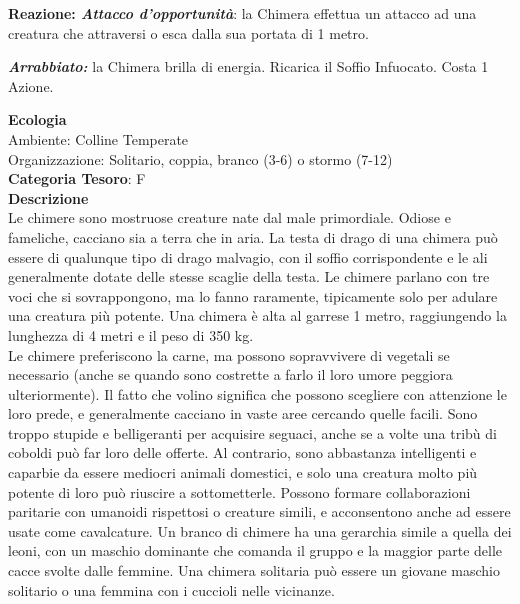 \begin{multicols}{2}
{\textbf{Reazione: \emph{Attacco d'opportunità}}: la Chimera effettua un attacco ad una creatura che attraversi o esca dalla sua portata di 1 metro.

\emph{\textbf{Arrabbiato:}} la Chimera brilla di energia. Ricarica il Soffio Infuocato. Costa 1 Azione.

\textbf{Ecologia}\\
Ambiente: Colline Temperate\\
Organizzazione: Solitario, coppia, branco (3-6) o stormo (7-12)\\
\textbf{Categoria Tesoro}: F\\
\textbf{Descrizione}\\
Le chimere sono mostruose creature nate dal male primordiale. Odiose e fameliche, cacciano sia a terra che in aria. La testa di drago di una chimera può essere di qualunque tipo di drago malvagio, con il soffio corrispondente e le ali generalmente dotate delle stesse scaglie della testa. Le chimere parlano con tre voci che si sovrappongono, ma lo fanno raramente, tipicamente solo per adulare una creatura più potente. Una chimera è alta al garrese 1 metro, raggiungendo la lunghezza di 4 metri e il peso di 350 kg.\\
Le chimere preferiscono la carne, ma possono sopravvivere di vegetali se necessario (anche se quando sono costrette a farlo il loro umore peggiora ulteriormente). Il fatto che volino significa che possono scegliere con attenzione le loro prede, e generalmente cacciano in vaste aree cercando quelle facili. Sono troppo stupide e belligeranti per acquisire seguaci, anche se a volte una tribù di coboldi può far loro delle offerte. Al contrario, sono abbastanza intelligenti e caparbie da essere mediocri animali domestici, e solo una creatura molto più potente di loro può riuscire a sottometterle. Possono formare collaborazioni paritarie con umanoidi rispettosi o creature simili, e acconsentono anche ad essere usate come cavalcature. Un branco di chimere ha una gerarchia simile a quella dei leoni, con un maschio dominante che comanda il gruppo e la maggior parte delle cacce svolte dalle femmine. Una chimera solitaria può essere un giovane maschio solitario o una femmina con i cuccioli nelle vicinanze.

}
\end{multicols}
